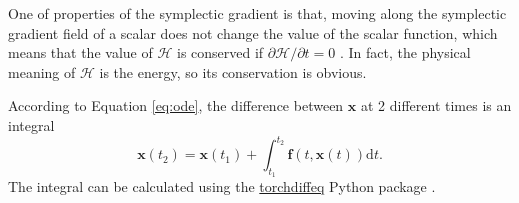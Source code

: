 \documentclass{article}
\begin{document}
One of properties of the symplectic gradient is that,
moving along the symplectic gradient field of a scalar does not change the value of the scalar function,
which means that the value of $\mathcal H$ is conserved if $\partial\mathcal H/\partial t=0$ \cite[p. 67]{arnold1989mathmech}\cite[p. 132]{landau1976mechanics}.
In fact, the physical meaning of $\mathcal H$ is the energy,
so its conservation is obvious.

According to Equation \ref{eq:ode}, the difference between $\mathbf x$ at 2 different times is an integral
\begin{equation}
	\mathbf x\left(t_2\right)=\mathbf x\left(t_1\right)+\int_{t_1}^{t_2}\mathbf f\left(t,\mathbf x\left(t\right)\right)\mathrm dt.
	\label{eq:int}
\end{equation}
The integral can be calculated using the \href{https://github.com/rtqichen/torchdiffeq}{torchdiffeq} Python package \cite{chen2018ode}.
\end{document}
